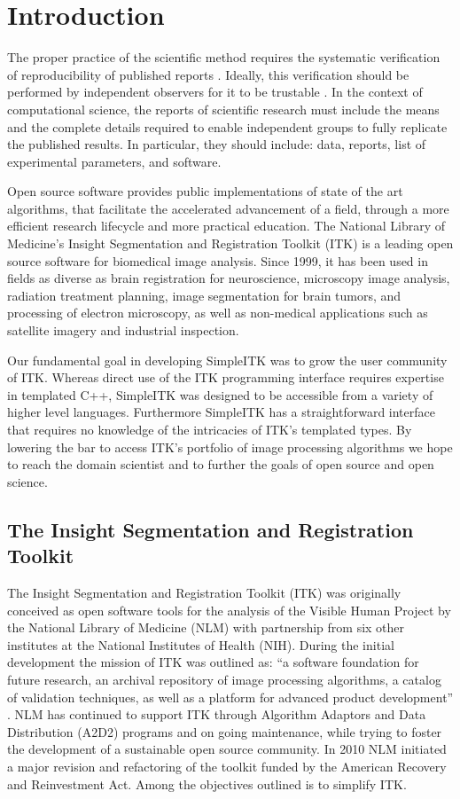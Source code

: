 \documentclass{frontiersMED} %
\begin{document}
\section{Introduction}
The proper practice of the scientific method requires the systematic
verification of reproducibility of published reports
\cite{Popper1934}. Ideally, this verification should be performed by
independent observers for it to be trustable \cite{Popper1968}. In
the context of computational science, the reports of scientific
research must include the means and the complete details required to
enable independent groups to fully replicate the published results. 
In particular, they should include: data, reports,
list of experimental parameters, and software.

Open source software provides public implementations of state of the
art algorithms, that facilitate the accelerated advancement of a
field, through a more efficient research lifecycle and more
practical education. The National Library of Medicine's Insight
Segmentation and Registration Toolkit (ITK) is a leading open source
software for biomedical image analysis. Since 1999, it has been used
in fields as diverse as brain registration for neuroscience, microscopy
image analysis, radiation treatment planning, image segmentation for
brain tumors, and processing of electron microscopy, as well as
non-medical applications such as satellite imagery and industrial
inspection.

Our fundamental goal in developing SimpleITK was to grow the user community
of ITK.  Whereas direct use of the ITK programming interface requires
expertise in templated C++, SimpleITK was designed to be accessible
from a variety of higher level languages.  Furthermore SimpleITK has a
straightforward interface that requires no knowledge of the
intricacies of ITK's templated types. By lowering the bar to access
ITK's portfolio of image processing algorithms we hope to reach the domain
scientist and to further the goals of open source and open science.

\subsection{The Insight Segmentation and Registration Toolkit}

The Insight Segmentation and Registration Toolkit (ITK) was originally
conceived as open software tools for the analysis of the Visible
Human Project by the National Library of Medicine (NLM) with
partnership from six other institutes at the National Institutes of
Health (NIH). During the initial development the mission of ITK was
outlined as: “a software foundation for future research, an archival
repository of image processing algorithms, a catalog of validation
techniques, as well as a platform for advanced product development”
\cite{Yoo2002}. NLM has continued to support ITK through Algorithm Adaptors
and Data Distribution (A2D2) programs and on going maintenance, while
trying to foster the development of a sustainable open source
community. In 2010 NLM initiated a major revision and refactoring of
the toolkit funded by the American Recovery and Reinvestment
Act. Among the objectives outlined is to simplify ITK.
\end{document}

